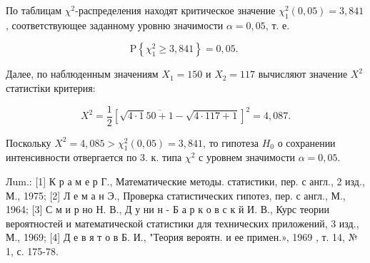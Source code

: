 \documentclass[10pt]{article}
\begin{document}
По таблицам $\chi^{2}$-распределения находят критическое значение $\chi_{1}^{2}(0,05)=3,841$, соответствующее заданному уровню значимости $\alpha=0,05$, т. е.



\[

\mathrm{P}\left\{\chi_{1}^{2} \geqslant 3,841\right\}=0,05 \text {. }

\]



Далее, по наблюденным значениям $X_{1}=150$ и $X_{2}=117$ вычисляют значение $X^{2}$ статистіки критерия:



\[

X^{2}=\frac{1}{2}[\sqrt{4 \cdot 1} \overline{50+1}-\sqrt{4 \cdot 117+1}]^{2}=4,087 .

\]



Поскольку $X^{2}=4,085>\chi_{1}^{2}(0,05)=3,841$, то гипотеза $H_{0}$ о сохранении интенсивности отвергается по 3. к. типа $\chi^{2}$ с уровнем значимости $\alpha=0,05$.



Лum.: [1] К р а м е р Г., Математические методы. статистики, пер. с англ., 2 изд., М., 1975; [2] Л е м а н Э., Проверка статистических гипотез, пер. с англ., М., 1964; [3] С м и р но Н. В., Д у ни н - Б а р к о в с к й И. В., Курс теории вероятностей и математической статистики для технических приложений, 3 изд., М., 1969; [4] Д е в я т о в Б. И., "Теория вероятн. и ее примен.», 1969 , т. 14, № 1, с. 175-78.
\end{document}
